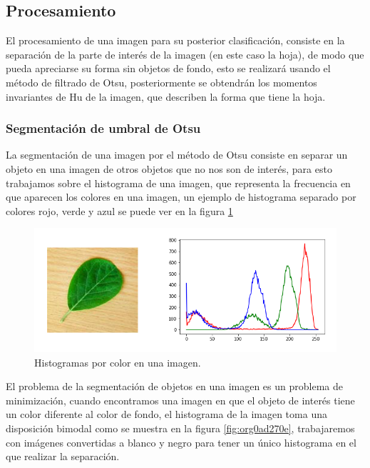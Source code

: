 \documentclass[letter]{article}
\begin{document}
\subsection{Procesamiento}
\label{sec:org52015ac}
El procesamiento de una imagen para su posterior clasificación, consiste en la
separación de la parte de interés de la imagen (en este caso la hoja), de modo
que pueda apreciarse su forma sin objetos de fondo, esto se realizará usando el
método de filtrado de Otsu, posteriormente se obtendrán los momentos invariantes
de Hu de la imagen, que describen la forma que tiene la hoja.

\subsubsection{Segmentación de umbral de Otsu}
\label{sec:orgc6a51a9}
La segmentación de una imagen por el método de Otsu consiste en separar un
objeto en una imagen de otros objetos que no nos son de interés, para esto
trabajamos sobre el histograma de una imagen, que representa la frecuencia en
que aparecen los colores en una imagen, un ejemplo de histograma separado por
colores rojo, verde y azul se puede ver en la figura \ref{fig:orga455bb8}

\begin{figure}[htbp]
\centering
\includegraphics[width=.9\linewidth]{./images/histogram1.png}
\caption{\label{fig:orga455bb8}Histogramas por color en una imagen.}
\end{figure}

El problema de la segmentación de objetos en una imagen es un problema de
minimización, cuando encontramos una imagen en que el objeto de interés tiene un
color diferente al color de fondo, el histograma de la imagen toma una
disposición bimodal como se muestra en la figura \ref{fig:org0ad270e}, trabajaremos con
imágenes convertidas a blanco y negro para tener un único histograma en el que
realizar la separación.
\end{document}
